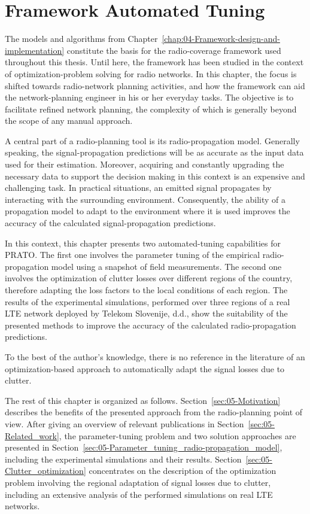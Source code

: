 
\chapter{Framework Automated Tuning \label{chap:05-Framework_parameter_tuning}}


\noindent The models and algorithms from Chapter~\ref{chap:04-Framework-design-and-implementation}
constitute the basis for the radio-coverage framework used throughout
this thesis. Until here, the framework has been studied in the context
of optimization-problem solving for radio networks. In this chapter,
the focus is shifted towards radio-network planning activities, and
how the framework can aid the network-planning engineer in his or
her everyday tasks. The objective is to facilitate refined network
planning, the complexity of which is generally beyond the scope of
any manual approach.

A central part of a radio-planning tool is its radio-propagation model.
Generally speaking, the signal-propagation predictions will be as
accurate as the input data used for their estimation. Moreover, acquiring
and constantly upgrading the necessary data to support the decision
making in this context is an expensive and challenging task. In practical
situations, an emitted signal propagates by interacting with the surrounding
environment. Consequently, the ability of a propagation model to adapt
to the environment where it is used improves the accuracy of the calculated
signal-propagation predictions.

In this context, this chapter presents two automated-tuning capabilities
for PRATO. The first one involves the parameter tuning of the empirical
radio-propagation model using a snapshot of field measurements. The
second one involves the optimization of clutter losses over different
regions of the country, therefore adapting the loss factors to the
local conditions of each region. The results of the experimental simulations,
performed over three regions of a real LTE network deployed by Telekom
Slovenije, d.d., show the suitability of the presented methods to
improve the accuracy of the calculated radio-propagation predictions.

To the best of the author's knowledge, there is no reference in the
literature of an optimization-based approach to automatically adapt
the signal losses due to clutter.

The rest of this chapter is organized as follows. Section~\ref{sec:05-Motivation}
describes the benefits of the presented approach from the radio-planning
point of view. After giving an overview of relevant publications in
Section~\ref{sec:05-Related_work}, the parameter-tuning problem
and two solution approaches are presented in Section~\ref{sec:05-Parameter_tuning_radio-propagation_model},
including the experimental simulations and their results. Section~\ref{sec:05-Clutter_optimization}
concentrates on the description of the optimization problem involving
the regional adaptation of signal losses due to clutter, including
an extensive analysis of the performed simulations on real LTE networks.


